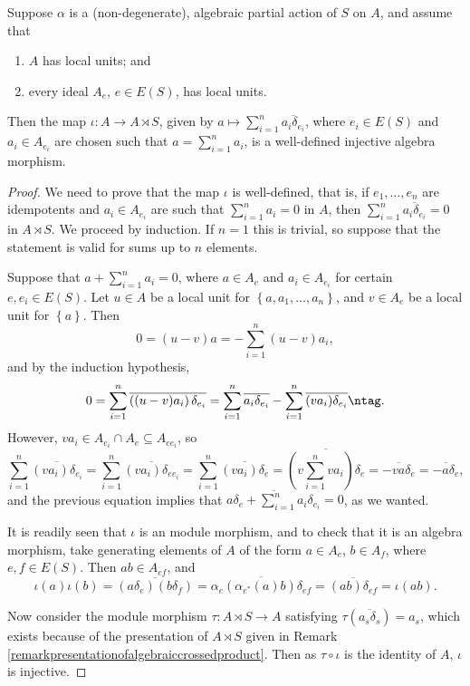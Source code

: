 \begin{proposition}
Suppose $\alpha$ is a (non-degenerate), algebraic partial action of $S$ on $A$, and assume that
\begin{enumerate}
\item[(i)] $A$ has local units; and
\item[(ii)] every ideal $A_e$, $e\in E(S)$, has local units.
\end{enumerate}
Then the map $\iota:A\to A\rtimes S$, given by $a\mapsto \sum_{i=1}^n \overline{a_i\delta_{e_i}}$, where $e_i\in E(S)$ and $a_i\in A_{e_i}$ are chosen such that $a=\sum_{i=1}^n a_i$, is a well-defined injective algebra morphism.
\end{proposition}
\begin{proof}
We need to prove that the map $\iota$ is well-defined, that is, if $e_1,\ldots,e_n$ are idempotents and $a_i\in A_{e_i}$ are such that $\sum_{i=1}^n a_i=0$ in $A$, then $\sum_{i=1}^n\overline{a_i\delta_{e_i}}=0$ in $A\rtimes S$. We proceed by induction. If $n=1$ this is trivial, so suppose that the statement is valid for sums up to $n$ elements.

Suppose that $a+\sum_{i=1}^n a_i=0$, where $a\in A_e$ and $a_i\in A_{e_i}$ for certain $e,e_i\in E(S)$. Let $u\in A$ be a local unit for $\left\{a,a_1,\ldots,a_n\right\}$, and $v\in A_e$ be a local unit for $\left\{a\right\}$. Then
\[0=(u-v)a=-\sum_{i=1}^n(u-v)a_i,\]
and by the induction hypothesis,
\[0=\sum_{i=1}^n\overline{\left((u-v)a_i\right)\delta_{e_i}}=\sum_{i=1}^n\overline{a_i\delta_{e_i}}-\sum_{i=1}^n\overline{(va_i)\delta_{e_i}}\ntag\label{equationdiagonalsubalgebraforcrossedproducts1}.\]
However, $va_i\in A_{e_i}\cap A_e\subseteq A_{ee_i}$, so
\[\sum_{i=1}^n\overline{(va_i)\delta_{e_i}}=\sum_{i=1}^n\overline{(va_i)\delta_{ee_i}}=\sum_{i=1}^n\overline{(va_i)\delta_e}=\overline{\left(v\sum_{i=1}^n va_i\right)\delta_e}=\overline{-va\delta_e}=\overline{-a\delta_e},\]
and the previous equation implies that $\overline{a\delta_e+\sum_{i=1}^na_i\delta_{e_i}}=0$, as we wanted.

It is readily seen that $\iota$ is an module morphism, and to check that it is an algebra morphism, take generating elements of $A$ of the form $a\in A_{e}$, $b\in A_{f}$, where $e,f\in E(S)$. Then $ab\in A_{ef}$, and
\[\iota(a)\iota(b)=\overline{(a\delta_e)(b\delta_f)}=\overline{\alpha_e(\alpha_{e^*}(a)b)\delta_{ef}}=\overline{(ab)\delta_{ef}}=\iota(ab).\]

Now consider the module morphism $\tau:A\rtimes S\to A$ satisfying $\tau(\overline{a_s\delta_s})=a_s$, which exists because of the presentation of $A\rtimes S$ given in Remark \ref{remarkpresentationofalgebraiccrossedproduct}. Then as $\tau\circ\iota$ is the identity of $A$, $\iota$ is injective.\qedhere
\end{proof}

